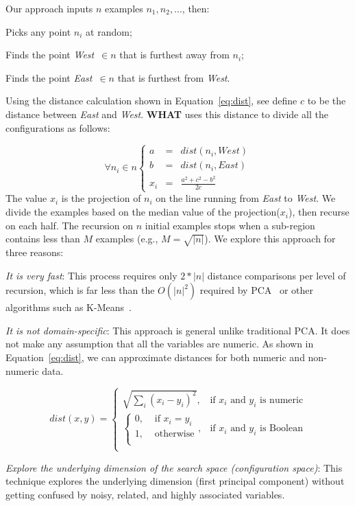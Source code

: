 \documentclass{sig-alternative}
\newcommand{\what}{{\bf WHAT }}
\begin{document}
Our approach inputs $n$
examples $n_1,n_2,...$, then:
\begin{compactenum}
\item
Picks any
point $n_i$ at random;
\item
Finds
 the point  {\em West}~$\in n$ that is
furthest away from $n_i$;
\item Finds the point {\em East}~$\in n$
that is furthest from {\em West}.
\end{compactenum}
Using the distance calculation shown in Equation~\ref{eq:dist}, 
see define $c$ to be the distance between {\em East}
and {\em West}.
\what uses this distance to divide all the configurations as follows:

\[
\forall  n_i \in n \left\{\begin{array}{rcl}
a&=&\mathit{dist}(n_i,\mathit{West})\\
b&=&\mathit{dist}(n_i,\mathit{East})\\
x_i&=&\frac{a^2 + c^2 - b^2}{2c}
\end{array}
\]
The value $x_i$ is the projection of $n_i$
on the line  running  from {\em East} to {\em West}.  We divide
the examples based on the median value of the projection($x_i$),
then recurse on each half. The recursion on
$n$ initial
examples stops when a sub-region
contains less than  $M$ examples (e.g., 
$M=\sqrt{|n|}$).
We explore this approach for three reasons:
\begin{compactitem}
\item
{\em It is very fast}:
This process requires only $2*|n|$ distance comparisons
per level of recursion, which is far less than the $O(|n|^2)$
required by PCA~\cite{Du2008}
or other  algorithms such as K-Means~\cite{hamerly2010making}.
\item
{\em It is not domain-specific}:
This approach is general unlike traditional PCA. It does not make any assumption that all the variables are numeric. As shown in Equation~\ref{eq:dist}, we can approximate distances for both numeric and non-numeric data.

\begin{equation}
    dist(x, y) = 
    \begin{cases}
        \sqrt{\sum_i(x_i-y_i)^2},& \text{if $x_i$ and $y_i$ is numeric}\\
        \begin{cases}
            0, & \text{ if $x_i = y_i$}\\
            1, & \text{ otherwise}\\
        \end{cases}
        ,& \text{if $x_i$ and $y_i$ is Boolean}\\
    \end{cases}
    \label{eq:dist}
\end{equation}

\item
{\em Explore the underlying dimension of the search space (configuration space)}:
This technique explores the underlying dimension (first principal component) without getting confused by noisy, related, and highly associated variables.
\end{compactitem}
\end{document}
